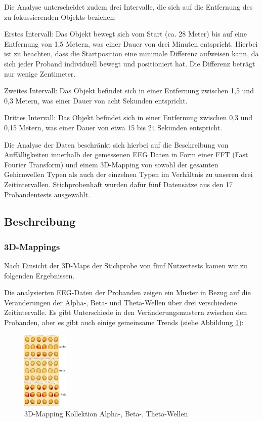 \documentclass[conference]{IEEEtran}
\begin{document}
Die Analyse unterscheidet zudem drei Intervalle, die sich auf die Entfernung des zu fokussierenden Objekts beziehen:

\begin{myitemize}
    \item Erstes Intervall: Das Objekt bewegt sich vom Start (ca. 28 Meter) bis auf eine Entfernung von 1,5 Metern, was einer Dauer von drei Minuten entspricht. Hierbei ist zu beachten, dass die Startposition eine minimale Differenz aufweisen kann, da sich jeder Proband individuell bewegt und positioniert hat. Die Differenz beträgt nur wenige Zentimeter.
    \item Zweites Intervall: Das Objekt befindet sich in einer Entfernung zwischen 1,5 und 0,3 Metern, was einer Dauer von acht Sekunden entspricht.
    \item Drittes Intervall: Das Objekt befindet sich in einer Entfernung zwischen 0,3 und 0,15 Metern, was einer Dauer von etwa 15 bis 24 Sekunden entspricht.
\end{myitemize}

Die Analyse der Daten beschränkt sich hierbei auf die Beschreibung von Auffälligkeiten innerhalb der gemessenen EEG Daten in Form einer FFT (Fast Fourier Transform) und einem 3D-Mapping von sowohl der gesamten Gehirnwellen Typen als auch der einzelnen Typen im Verhältnis zu unseren drei Zeitintervallen. Stichprobenhaft wurden dafür fünf Datensätze aus den 17 Probandentests ausgewählt. 
\subsection{Beschreibung}

\subsubsection{3D-Mappings}

Nach Einsicht der 3D-Maps der Stichprobe von fünf Nutzertests kamen wir zu folgenden Ergebnissen.

Die analysierten EEG-Daten der Probanden zeigen ein Muster in Bezug auf die Veränderungen der Alpha-, Beta- und Theta-Wellen über drei verschiedene Zeitintervalle. Es gibt Unterschiede in den Veränderungsmustern zwischen den Probanden, aber es gibt auch einige gemeinsame Trends (siehe Abbildung \ref{fig:3D_Mapping_Collection}):

\begin{figure}[ht]
	\centering
	\includegraphics[width=0.2\textwidth]{assets/Collection3DMapping.jpg} \hspace{-5pt}
	\caption{3D-Mapping Kollektion Alpha-, Beta-, Theta-Wellen}
	\label{fig:3D_Mapping_Collection}
\end{figure}
\end{document}
